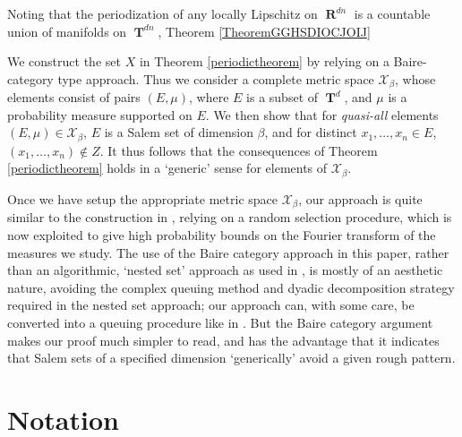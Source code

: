\documentclass[12pt,reqno]{article}
\numberwithin{equation}{section}
\DeclareMathOperator{\RR}{\mathbf{R}}
\DeclareMathOperator{\TT}{\mathbf{T}}
\numberwithin{theorem}{section}
\begin{document}
Noting that the periodization of any locally Lipschitz on $\RR^{dn}$ is a countable union of manifolds on $\TT^{dn}$, Theorem \ref{TheoremGGHSDIOCJOIJ}

We construct the set $X$ in Theorem \ref{periodictheorem} by relying on a Baire-category type approach. Thus we consider a complete metric space $\mathcal{X}_\beta$, whose elements consist of pairs $(E,\mu)$, where $E$ is a subset of $\TT^d$, and $\mu$ is a probability measure supported on $E$. We then show that for \emph{quasi-all} elements $(E,\mu) \in \mathcal{X}_\beta$, $E$ is a Salem set of dimension $\beta$, and for distinct $x_1,\dots,x_n \in E$, $(x_1,\dots,x_n) \not \in Z$. %
It thus follows that the consequences of Theorem \ref{periodictheorem} holds in a `generic' sense for elements of $\mathcal{X}_\beta$.

Once we have setup the appropriate metric space $\mathcal{X}_\beta$, our approach is quite similar to the construction in \cite{OurPaper}, relying on a random selection procedure, which is now exploited to give high probability bounds on the Fourier transform of the measures we study. The use of the Baire category approach in this paper, rather than an algorithmic, `nested set' approach as used in \cite{OurPaper}, is mostly of an aesthetic nature, avoiding the complex queuing method and dyadic decomposition strategy required in the nested set approach; our approach can, with some care, be converted into a queuing procedure like in \cite{OurPaper}. But the Baire category argument makes our proof much simpler to read, and has the advantage that it indicates that Salem sets of a specified dimension `generically' avoid a given rough pattern.%

\section{Notation} \label{notationSection}
\end{document}

